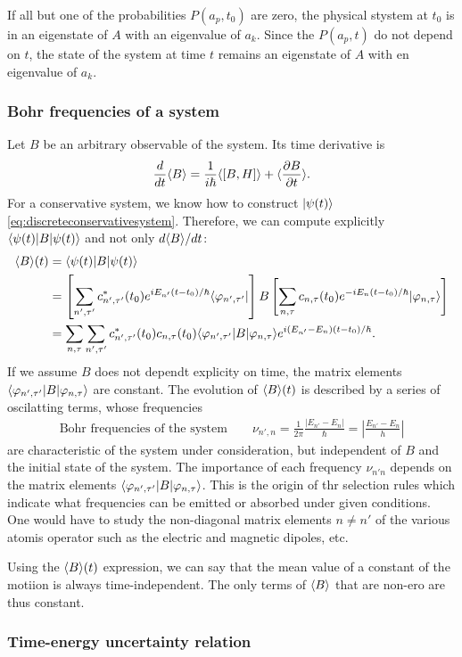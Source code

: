 If all but one of the probabilities $P(a_p,t_0)$ are zero, the physical stystem at $t_0$ is in an eigenstate of $A$ with an eigenvalue of 
$a_k$. Since the $P(a_p,t)$ do not depend on $t$, the state of the system at time $t$ remains an eigenstate of $A$ with en eigenvalue of $a_k$.
\subsubsection{Bohr frequencies of a system}
Let $B$ be an arbitrary observable of the system. Its time derivative is 
\begin{align*}
    \frac{d}{dt}\langle B\rangle=\frac{1}{i\hbar}\langle[B,H]\rangle+\langle\frac{\partial B}{\partial t}\rangle.
\end{align*}
For a conservative system, we know how to construct $|\psi(t)\rangle$ \eqref{eq:discreteconservativesystem}. Therefore, we can 
compute explicitly $\langle\psi(t)|B|\psi(t)\rangle$ and not only $d\langle B\rangle/dt$:
\begin{align*}
    \langle B\rangle(t)&=\langle\psi(t)|B|\psi(t)\rangle\\
    &=\left[\sum_{n',\tau'}c^*_{n',\tau'}(t_0)e^{iE_{n'}(t-t_0)/\hbar}\langle\varphi_{n',\tau'}|\right]B\left[\sum_{n,\tau}c_{n,\tau}(t_0)e^{-iE_n(t-t_0)/\hbar}|\varphi_{n,\tau}\rangle\right]\\
    &=\sum_{n,\tau}\sum_{n',\tau'}c^*_{n',\tau'}(t_0)c_{n,\tau}(t_0)\langle\varphi_{n',\tau'}|B|\varphi_{n,\tau}\rangle e^{i(E_{n'}-E_n)(t-t_0)/\hbar}.
\end{align*}
If we assume $B$ does not dependt explicity on time, the matrix elements $\langle\varphi_{n',\tau'}|B|\varphi_{n,\tau}\rangle$ are constant.
The evolution of $\langle B\rangle(t)$ is described by a series of oscilatting terms, whose frequencies 
\begin{align*}
    \text{Bohr frequencies of the system}\qquad\nu_{n',n}=\frac{1}{2\pi}\frac{|E_{n'}-E_n|}{\hbar}=\left|\frac{E_{n'}-E_n}{h}\right|
\end{align*}
are characteristic of the system under consideration, but independent of $B$ and the initial state of the system.
The importance of each frequency $\nu_{n'n}$ depends on the matrix elements $\langle\varphi_{n',\tau'}|B|\varphi_{n,\tau}\rangle$.
This is the origin of thr selection rules which indicate what frequencies can be emitted or absorbed under given conditions. One would have 
to study the non-diagonal matrix elements $n\neq n'$ of the various atomis operator such as the electric and magnetic dipoles, etc.

Using the $\langle B\rangle(t)$ expression, we can say that the mean value of a constant of the motiion is always time-independent.
The only terms of $\langle B\rangle$ that are non-ero are thus constant.

\subsubsection{Time-energy uncertainty relation}

